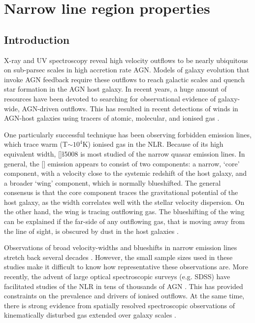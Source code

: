 
\chapter{Narrow line region properties}
\label{ch:nlr} 

\section{Introduction}

X-ray and \ac{UV} spectroscopy reveal high velocity outflows to be nearly ubiquitous on sub-parsec scales in high accretion rate \ac{AGN}.
Models of galaxy evolution that invoke \ac{AGN} feedback require these outflows to reach galactic scales and quench star formation in the \ac{AGN} host galaxy. 
In recent years, a huge amount of resources have been devoted to searching for observational evidence of galaxy-wide, \ac{AGN}-driven outflows. 
This has resulted in recent detections of winds in \ac{AGN}-host galaxies using tracers of atomic, molecular, and ionised gas \citep[e.g.][]{nesvadba06,arav08,nesvadba08,moe09,dunn10,alexander10,harrison12,harrison14,nesvadba10,rupke13,veilleux13,nardini15,feruglio10,alatalo11,cimatti13,cicone14}.  

One particularly successful technique has been observing forbidden emission lines, which trace warm (T$\sim$$10^4$K) ionised gas in the \ac{NLR}. 
Because of its high equivalent width, []\l5008 is most studied of the narrow quasar emission lines. 
In general, the [] emission appears to consist of two components: a narrow, `core' component, with a velocity close to the systemic redshift of the host galaxy, and a broader `wing' component, which is normally blueshifted. 
The general consensus is that the core component traces the gravitational potential of the host galaxy, as the width correlates well with the stellar velocity dispersion. 
On the other hand, the wing is tracing outflowing gas. 
The blueshifting of the wing can be explained if the far-side of any outflowing gas, that is moving away from the line of sight, is obscured by dust in the host galaxies \citep[e.g.][]{heckman81,vrtilek85}. 

Observations of broad velocity-widths and blueshifts in narrow emission lines stretch back several decades \citep[e.g.][]{weedman70,stockton76,heckman81,veron81,feldman82,heckman84,vrtilek85,whittle85,boroson92}. 
However, the small sample sizes used in these studies make it difficult to know how representative these observations are. 
More recently, the advent of large optical spectroscopic surveys (e.g. \ac{SDSS}) have facilitated studies of the \ac{NLR} in tens of thousands of \ac{AGN} \citep[e.g.][]{boroson05,greene05a,zhang11,mullaney13,zakamska14,shen14}. 
This has provided constraints on the prevalence and drivers of ionised outflows.   
At the same time, there is strong evidence from spatially resolved spectroscopic observations of kinematically disturbed gas extended over galaxy scales \citep[e.g.][]{greene09,greene11,hainline13,harrison12,harrison14}. 

